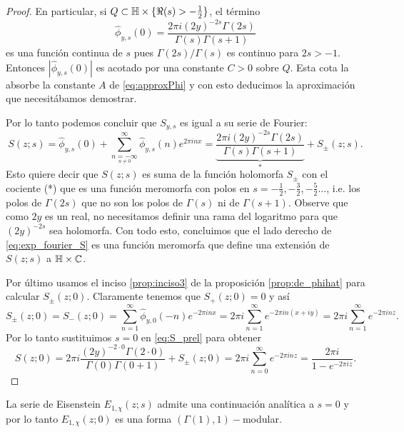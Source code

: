\begin{proof}
  En particular, si $Q\subset\mathbb{H}\times\{\Re(s)>-\tfrac{1}{2}\}$, el t\'ermino
  \[
    \hat{\phi}_{y,s}(0)=\frac{2\pi i(2y)^{-2s}\Gamma(2s)}{\Gamma(s)\Gamma(s+1)}
  \]
  es una funci\'on continua de $s$ pues $\Gamma(2s)/\Gamma(s)$ es continuo para $2s>-1$.
  Entonces $|\hat{\phi}_{y,s}(0)|$ es acotado por una constante $C>0$ sobre $Q$. Esta cota la
  absorbe la constante $A$ de \eqref{eq:approxPhi} y con esto deducimos la
  aproximaci\'on que necesit\'abamos demostrar.

  Por lo tanto podemos concluir que $S_{y,s}$ es igual a su serie de Fourier:
  \begin{equation}\label{eq:S_prel}
    S(z;s)=\hat{\phi}_{y,s}(0)+
    \sum_{\underset{n\neq0}{n=-\infty}}^{\infty}\hat{\phi}_{y,s}(n)e^{2\pi inx}=
    \underset{*}{\underbrace{\frac{2\pi i(2y)^{-2s}\Gamma(2s)}{\Gamma(s)\Gamma(s+1)}}}+S_{\pm}(z;s).
  \end{equation}
  Esto quiere decir que $S(z;s)$ es suma de la funci\'on holomorfa $S_{\pm}$ con el
  cociente (*) que es una funci\'on meromorfa con polos en
  $s=-\tfrac{1}{2},-\tfrac{3}{2},-\tfrac{5}{2}\ldots$, i.e. los polos de $\Gamma(2s)$
  que no son los polos de $\Gamma(s)$ ni de $\Gamma(s+1)$. Observe que como $2y$ es un
  real, no necesitamos definir una rama del logaritmo para que $(2y)^{-2s}$ sea holomorfa.
  Con todo esto, concluimos que el lado derecho de \eqref{eq:exp_fourier_S} es una funci\'on
  meromorfa que define una extensi\'on de $S(z;s)$ a $\mathbb{H}\times\mathbb{C}$.

  Por \'ultimo usamos el inciso \ref{prop:inciso3} de la proposici\'on
  \ref{prop:de_phihat} para calcular $S_{\pm}(z;0)$. Claramente tenemos
  que $S_+(z;0)=0$ y as\'i
  \[
    S_{\pm}(z;0)=
    S_-(z;0)=
    \sum_{n=1}^{\infty}\hat{\phi}_{y,0}(-n)e^{-2\pi inx}=
    2\pi i\sum_{n=1}^{\infty}e^{-2\pi in(x+iy)}=2\pi i\sum_{n=1}^{\infty}e^{-2\pi i nz}.
  \]
  Por lo tanto sustituimos $s=0$ en \eqref{eq:S_prel} para obtener
  \[
    S(z;0)=
    2\pi i\frac{(2y)^{-2\cdot0}\Gamma(2\cdot0)}{\Gamma(0)\Gamma(0+1)}+S_{\pm}(z;0)=
    2\pi i\sum_{n=0}^{\infty}e^{-2\pi i nz}=\frac{2\pi i}{1-e^{-2\pi i z}}.
  \]
\end{proof}






\begin{prop}%
  La serie de Eisenstein $E_{1,\chi}(z;s)$ admite una continuaci\'on anal\'itica a $s=0$ y
  por lo tanto $E_{1,\chi}(z;0)$ es una forma $(\Gamma(1),1)-$modular.
\end{prop}%

